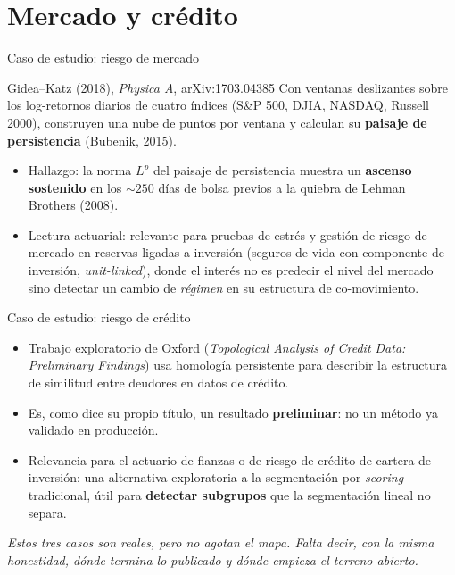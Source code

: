 \documentclass[aspectratio=169,11pt]{beamer}
\newcommand{\defterm}[1]{\textbf{\color{accent}#1}}
\begin{document}
\section{Mercado y crédito}
\begin{frame}{Caso de estudio: riesgo de mercado}
  \begin{block}{Gidea--Katz (2018), \textit{Physica A}, arXiv:1703.04385}
    Con ventanas deslizantes sobre los log-retornos diarios de cuatro
    índices (S\&P 500, DJIA, NASDAQ, Russell 2000), construyen una nube de
    puntos por ventana y calculan su \defterm{paisaje de persistencia}
    (Bubenik, 2015).
  \end{block}
  \begin{itemize}
    \item Hallazgo: la norma $L^p$ del paisaje de persistencia muestra un
      \textbf{ascenso sostenido} en los $\sim 250$ días de bolsa previos a
      la quiebra de Lehman Brothers (2008).
    \item Lectura actuarial: relevante para pruebas de estrés y gestión de
      riesgo de mercado en reservas ligadas a inversión (seguros de vida
      con componente de inversión, \textit{unit-linked}), donde el interés
      no es predecir el nivel del mercado sino detectar un cambio de
      \emph{régimen} en su estructura de co-movimiento.
  \end{itemize}
\end{frame}

\begin{frame}{Caso de estudio: riesgo de crédito}
  \begin{itemize}
    \item Trabajo exploratorio de Oxford (\textit{Topological Analysis of
      Credit Data: Preliminary Findings}) usa homología persistente para
      describir la estructura de similitud entre deudores en datos de
      crédito.
    \item Es, como dice su propio título, un resultado \textbf{preliminar}:
      no un método ya validado en producción.
    \item Relevancia para el actuario de fianzas o de riesgo de crédito de
      cartera de inversión: una alternativa exploratoria a la segmentación
      por \textit{scoring} tradicional, útil para \textbf{detectar
      subgrupos} que la segmentación lineal no separa.
  \end{itemize}
  \vspace{0.8em}
  {\small\itshape\color{muted}
  Estos tres casos son reales, pero no agotan el mapa. Falta decir, con
  la misma honestidad, dónde termina lo publicado y dónde empieza el
  terreno abierto.}
\end{frame}
\end{document}
